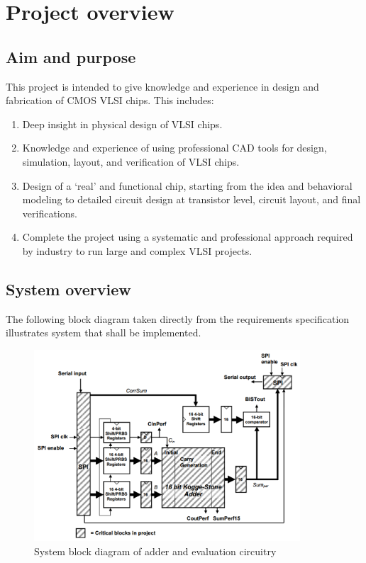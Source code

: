 \section{Project overview}


\subsection{Aim and purpose}
This project is intended to give knowledge and experience in design and fabrication of CMOS VLSI chips. This includes:
\begin{enumerate}
 \item Deep insight in physical design of VLSI chips.
 \item Knowledge and experience of using professional CAD tools for design, simulation, layout, and verification of VLSI chips.
 \item Design of a ‘real’ and functional chip, starting from the idea and behavioral modeling to detailed circuit design at transistor level, circuit layout, and final verifications.
 \item Complete the project using a systematic and professional approach required by industry to run large and complex VLSI projects.
\end{enumerate}

\subsection{System overview}
The following block diagram taken directly from the requirements specification illustrates system that shall be implemented.
\begin{figure}[H]
  \begin{center}
    \includegraphics[keepaspectratio=true,width=375px]{grafik/block.png}
    \caption{System block diagram of adder and evaluation circuitry}
    \label{organisationsplan}
  \end{center}
\end{figure}